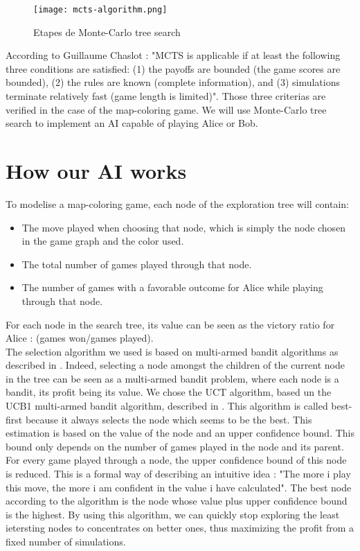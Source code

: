 \begin{figure}
\centering
\texttt{[image: mcts-algorithm.png]}
\caption{Etapes de Monte-Carlo tree search}
\end{figure}

According to Guillaume Chaslot \cite{ChaPHD} : "MCTS is
applicable if at least the following three conditions are satisfied: (1) the payoffs are bounded
(the game scores are bounded), (2) the rules are known (complete information), and (3) simulations terminate relatively fast (game length is limited)". Those three criterias are verified in the case of the map-coloring game. We will use Monte-Carlo tree search to implement an AI capable of playing Alice or Bob.\\

\section{How our AI works}

To modelise a map-coloring game, each node of the exploration tree will contain:
\begin{itemize}
\item The move played when choosing that node, which is simply the node chosen in the game graph and the color used.
\item The total number of games played through that node.
\item The number of games with a favorable outcome for Alice while playing through that node.
\end{itemize}
For each node in the search tree, its value can be seen as the victory ratio for Alice : (games won/games played).\\

The selection algorithm we used is based on multi-armed bandit algorithms as described in \cite{MAB}. Indeed, selecting a node amongst the children of the current node in the tree can be seen as a multi-armed bandit problem, where each node is a bandit, its profit being its value. We chose the UCT algorithm, based un the UCB1 multi-armed bandit algorithm, described in \cite{ChaPHD}. This algorithm is called best-first because it always selects the node which seems to be the best. This estimation is based on the value of the node and an upper confidence bound. This bound only depends on the number of games played in the node and its parent. For every game played through a node, the upper confidence bound of this node is reduced. This is a formal way of describing an intuitive idea : "The more i play this move, the more i am confident in the value i have calculated". The best node according to the algorithm is the node whose value plus upper confidence bound is the highest. By using this algorithm, we can quickly stop exploring the least ietersting nodes to concentrates on better ones, thus maximizing the profit from a fixed number of simulations.\\


